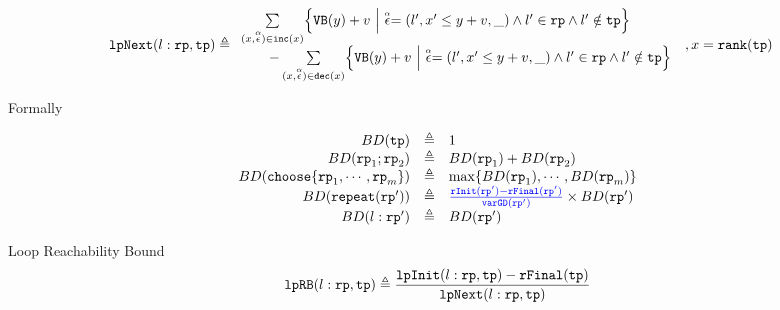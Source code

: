 \begin{defn}
\begin{itemize}
%
\[
  \begin{array}{l}
  \lpnext(l: \rprog, \tpath) \triangleq 
    \begin{array}{l}
  \sum\limits_{(x, \absevent) \in \inc(x) }
  \left\{ 
    \varinvar(y) + v ~\middle\vert~ \absevent = (l', x' \leq y + v, \_) \land  l' \in \rprog 
    \land l' \notin \tpath \right\}
    \\ \qquad 
    - \sum\limits_{(x, \absevent) \in \dec(x) }\left\{ 
      \varinvar(y) + v 
      ~\middle\vert~ \absevent = (l', x' \leq y + v, \_) \land l' \in \rprog \land l' \notin \tpath \right\}
    \end{array}
  \end{array}
  , x = \locbound(\tpath)
  \]
    \end{itemize}
\end{defn}

Formally
\begin{defn}
\label{def:loopbound}
\[
  \begin{array}{rcl}
    BD(\tpath) & \triangleq & 1 \\
    BD(\rprog_1;\rprog_2) & \triangleq & BD(\rprog_1) + BD(\rprog_2) \\
    BD(\rpchoose{\rprog_1, \cdots, \rprog_m }) & \triangleq 
    & \max\left\{ BD(\rprog_1), \cdots, BD(\rprog_m) \right\} \\
    BD(\rprepeat(\rprog')) & \triangleq 
    &
    \highlight{\frac{\rfinit(\rprog') - \rffinal(\rprog')}{\varGD(\rprog')}}
     \times BD(\rprog')
     \\
    BD(l: \rprog') & \triangleq & BD(\rprog')
  \end{array}
  \]
\end{defn}

\begin{defn}
  \label{def:looprb}
  Loop Reachability Bound
  \[
    \mathtt{lpRB}(l: \mathtt{rp}, \mathtt{tp}) \triangleq
      \frac{\mathtt{lpInit}(l: \mathtt{rp}, \mathtt{tp}) - \mathtt{rFinal}(\mathtt{tp})}{\mathtt{lpNext}(l: \mathtt{rp}, \mathtt{tp})}
  \]
\end{defn}